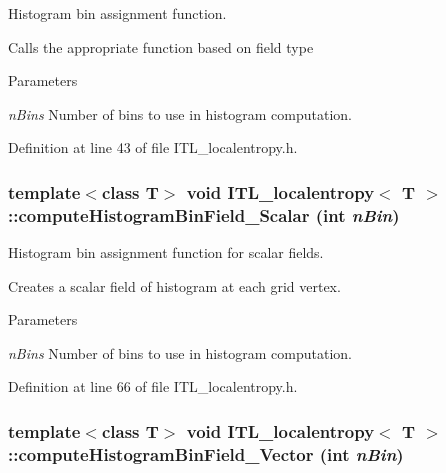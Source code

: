 Histogram bin assignment function. 

Calls the appropriate function based on field type 
\begin{DoxyParams}{Parameters}
\item[{\em nBins}]Number of bins to use in histogram computation. \end{DoxyParams}


Definition at line 43 of file ITL\_\-localentropy.h.

\hypertarget{classITL__localentropy_a6bc03e6046e17fd950d35c30082bb2b3}{
\subsubsection[{computeHistogramBinField\_\-Scalar}]{\setlength{\rightskip}{0pt plus 5cm}template$<$class T$>$ void {\bf ITL\_\-localentropy}$<$ T $>$::computeHistogramBinField\_\-Scalar (int {\em nBin})}}
\label{classITL__localentropy_a6bc03e6046e17fd950d35c30082bb2b3}


Histogram bin assignment function for scalar fields. 

Creates a scalar field of histogram at each grid vertex. 
\begin{DoxyParams}{Parameters}
\item[{\em nBins}]Number of bins to use in histogram computation. \end{DoxyParams}


Definition at line 66 of file ITL\_\-localentropy.h.

\hypertarget{classITL__localentropy_aca2e2602a26960d75be5edb64df37db2}{
\subsubsection[{computeHistogramBinField\_\-Vector}]{\setlength{\rightskip}{0pt plus 5cm}template$<$class T$>$ void {\bf ITL\_\-localentropy}$<$ T $>$::computeHistogramBinField\_\-Vector (int {\em nBin})}}
\label{classITL__localentropy_aca2e2602a26960d75be5edb64df37db2}


